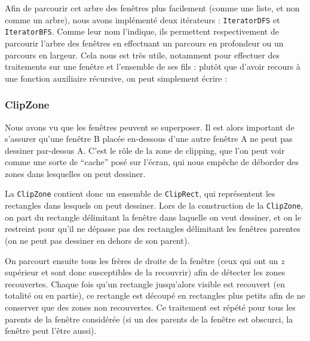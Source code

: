 Afin de parcourir cet arbre des fenêtres plus facilement (comme une liste, et non comme un arbre), nous avons implémenté deux itérateurs : \verb|IteratorDFS| et \verb|IteratorBFS|. Comme leur nom l'indique, ils permettent respectivement de parcourir l'arbre des fenêtres en effectuant un parcours en profondeur ou un parcours en largeur. Cela nous est très utile, notamment pour effectuer des traitements sur une fenêtre et l'ensemble de ses fils : plutôt que d'avoir recours à une fonction auxiliaire récursive, on peut simplement écrire :


\subsubsection{ClipZone}
\label{ClipZone}

Nous avons vu que les fenêtres peuvent se superposer. Il est alors important de s'assurer qu'une fenêtre B placée en-dessous d'une autre fenêtre A ne peut pas dessiner par-dessus A. C'est le rôle de la zone de clipping, que l'on peut voir comme une sorte de ``cache'' posé sur l'écran, qui nous empêche de déborder des zones dans lesquelles on peut dessiner.

La \verb|ClipZone| contient donc un ensemble de \verb|ClipRect|, qui représentent les rectangles dans lesquels on peut dessiner. Lors de la construction de la \verb|ClipZone|, on part du rectangle délimitant la fenêtre dans laquelle on veut dessiner, et on le restreint pour qu'il ne dépasse pas des rectangles délimitant les fenêtres parentes (on ne peut pas dessiner en dehors de son parent).

On parcourt ensuite tous les frères de droite de la fenêtre (ceux qui ont un $z$ supérieur et sont donc susceptibles de la recouvrir) afin de détecter les zones recouvertes. Chaque fois qu'un rectangle jusqu'alors visible est recouvert (en totalité ou en partie), ce rectangle est découpé en rectangles plus petits afin de ne conserver que des zones non recouvertes. Ce traitement est répété pour tous les parents de la fenêtre considérée (si un des parents de la fenêtre est obscurci, la fenêtre peut l'être aussi).


